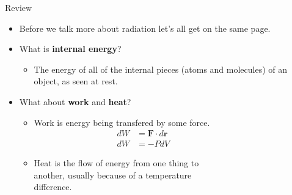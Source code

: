 \documentclass{beamer}
\begin{document}
\begin{frame}[t]{Review}
\begin{itemize}
   \item Before we talk more about radiation let's all get on the same page.
   \item<2-> What is {\bf internal energy}?
   \begin{itemize}
      \item<3-> The energy of all of the internal pieces (atoms and molecules) of an object, as seen at rest.
   \end{itemize}
   \item<4-> What about {\bf work} and {\bf heat}?
   \begin{itemize}
      \item<5-> Work is energy being transfered by some force.
      \begin{align*}
         dW&=\mathbf{F}\cdot d\mathbf{r}~~~~~~~~~~~~~~~~~~~~~~~~~~~~~~~~\\
         dW&=-PdV~~~~~~~~~~~~~~~~~~~~~~~~~~~~~~~~
      \end{align*}
      \vspace{-0.8cm}
      \item<6-> Heat is the flow of energy from one thing to \\ another, usually because of a temperature \\ difference.
   \end{itemize}
\end{itemize}
\end{frame}
\end{document}
